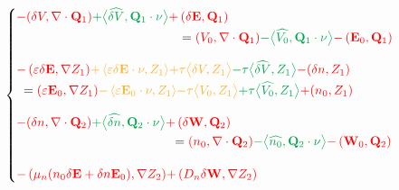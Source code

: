 \documentclass[a4paper,12pt]{article}
\newcommand{\diver}[1]{\ensuremath{\nabla \cdot #1}}
\begin{document}
\begin{equation*}
 \begin{cases}
  \begin{aligned}
   {\color{red} -(\delta V, \diver{\mathbf{Q}_{1}})}
         {\color{Green} + \big<\widehat{\delta V}, \mathbf{Q}_{1} \cdot \nu \big>}
         {\color{red} + \left(\delta \mathbf{E}, \mathbf{Q}_{1} \right)} \\
       & \hspace{-39.5pt} = {\color{red} (V_0, \diver{\mathbf{Q}_{1}})}
           {\color{Green} - \big<\widehat{V_{0}}, \mathbf{Q}_{1} \cdot \nu \big>} 
           {\color{red} - \left(\mathbf{E}_{0}, \mathbf{Q}_{1} \right)}
  \end{aligned} \\[20pt]
  \begin{aligned}
  {\color{red} - \left(\varepsilon\delta \mathbf{E}, \nabla Z_{1}\right)}
          {\color{Dandelion} + \left<\varepsilon  \delta \mathbf{E} \cdot \nu, Z_{1}\right>}
          {\color{Dandelion} + \tau \big< \delta V, Z_{1} \big>}
          {\color{Green} - \tau \big<\widehat{\delta V}, Z_{1} \big>} 
          {\color{red} - ( \delta n , Z_{1})} \\
      & \hspace{-261pt}  = {\color{red} \left(\varepsilon \mathbf{E}_{0}, \nabla Z_{1}\right)}
          {\color{Dandelion} - \left<\varepsilon \mathbf{E}_{0} \cdot \nu, Z_{1}\right>}
          {\color{Dandelion} - \tau \big< V_{0}, Z_{1} \big>}
          {\color{Green} + \tau \big<\widehat{V_{0}}, Z_{1} \big>}
          {\color{red} + (n_{0}, Z_{1})}
  \end{aligned} \\[20pt]
    \begin{aligned}
  {\color{red} -(\delta n, \diver{\mathbf{Q}_{2}})}
          {\color{Green} + \big<\widehat{\delta n}, \mathbf{Q}_{2} \cdot \nu \big>} 
          {\color{red} + \left(\delta \mathbf{W}, \mathbf{Q}_{2} \right)} \\
      & \hspace{-47pt} = {\color{red} (n_0, \diver{\mathbf{Q}_{2}})}
          {\color{Green} - \big<\widehat{n_{0}}, \mathbf{Q}_{2} \cdot \nu \big>}
          {\color{red} - \left(\mathbf{W}_{0}, \mathbf{Q}_{2} \right)}
  \end{aligned} \\[20pt]
  \begin{aligned}
  {\color{red}-\left(\mu_n(n_{0}\delta\mathbf{E} + \delta n \mathbf{E}_{0}), \nabla Z_{2}\right)}
          {\color{red} + \left( D_n  \delta \mathbf{W}, \nabla Z_{2} \right)}

\end{aligned}
\end{cases}
\end{equation*}
\end{document}
